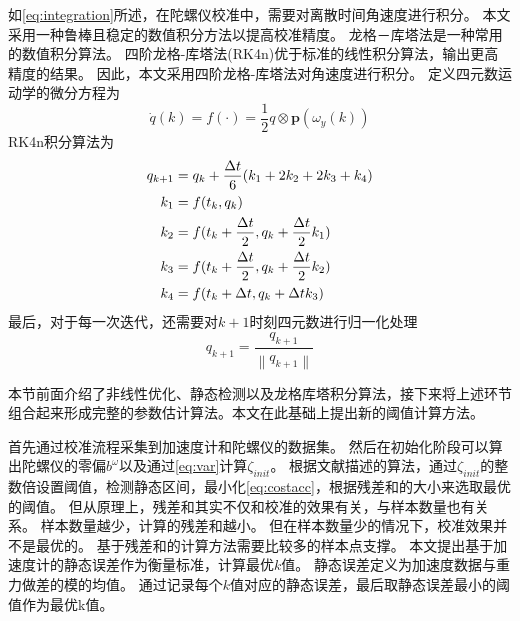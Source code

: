 \documentclass[
  type=master
]{gdutthesis}
\begin{document}
如\autoref{eq:integration}所述，在陀螺仪校准中，需要对离散时间角速度进行积分。
本文采用一种鲁棒且稳定的数值积分方法以提高校准精度。
龙格－库塔法是一种常用的数值积分算法\cite{andrle2013geometric}。
四阶龙格-库塔法(RK4n)优于标准的线性积分算法，输出更高精度的结果。
因此，本文采用四阶龙格-库塔法对角速度进行积分。
定义四元数运动学的微分方程为
\begin{equation}
	\dot{q}(k)=f(\cdot )=\frac{1}{2} q \otimes \mathbf{p}(\omega_y(k))
\end{equation}
RK4n积分算法为
\begin{equation}\label{eq:rk4}
	\begin{aligned}
		q_{k+1} &= q_k + \frac{\Delta t}{6}(k_1 + 2 k_2 + 2 k_3 + k_4)\\
		k_1 &= f(t_k , q_k)\\
		k_2 &= f(t_k + \frac{\Delta t}{2},q_k + \frac{\Delta t}{2} k_1)\\
		k_3 &= f(t_k + \frac{\Delta t}{2},q_k + \frac{\Delta t}{2} k_2)\\
		k_4 &= f(t_k + \Delta t, q_k + \Delta t k_3)\vspace{1ex}
	\end{aligned}
\end{equation}
最后，对于每一次迭代，还需要对$k+1$时刻四元数进行归一化处理
\begin{equation}
	q_{k+1} = \frac{q_{k+1}}{\left\|q_{k+1}\right\|}
\end{equation}

本节前面介绍了非线性优化、静态检测以及龙格库塔积分算法，接下来将上述环节组合起来形成完整的参数估计算法。本文在此基础上提出新的阈值计算方法。

首先通过校准流程采集到加速度计和陀螺仪的数据集。
然后在初始化阶段可以算出陀螺仪的零偏$b^\omega$以及通过\autoref{eq:var}计算$\zeta_{init}$。
根据文献\parencite{tedaldi2014robust}描述的算法，通过$\zeta_{init}$的整数倍设置阈值，检测静态区间，最小化\autoref{eq:costacc}，根据残差和的大小来选取最优的阈值。
但从原理上，残差和其实不仅和校准的效果有关，与样本数量也有关系。
样本数量越少，计算的残差和越小。
但在样本数量少的情况下，校准效果并不是最优的。
基于残差和的计算方法需要比较多的样本点支撑。
本文提出基于加速度计的静态误差作为衡量标准，计算最优$k$值。
静态误差定义为加速度数据与重力做差的模的均值。
通过记录每个$k$值对应的静态误差，最后取静态误差最小的阈值作为最优k值。
\end{document}
